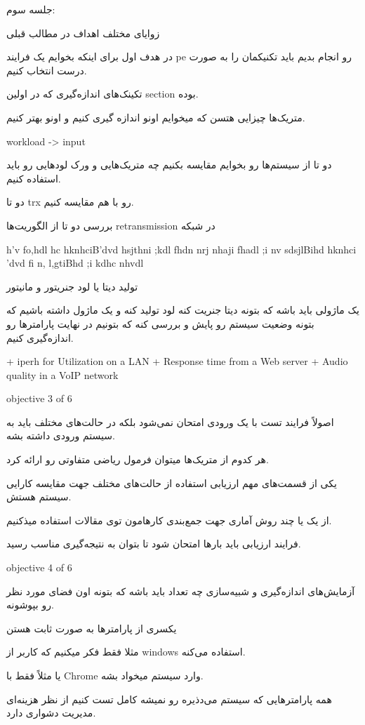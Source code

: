 جلسه سوم:

زوایای مختلف اهداف در مطالب قبلی

در هدف اول برای اینکه بخوایم یک فرایند pe رو انجام بدیم باید تکنیکمان را به صورت درست انتخاب کنیم.

تکینک‌های اندازه‌گیری که در اولین section بوده.

متریک‌ها چیزایی هتسن که میخوایم اونو اندازه گیری کنیم و اونو بهتر کنیم.

workload -> input

دو تا از سیستم‌ها رو بخوایم مقایسه بکنیم چه متریک‌هایی و ورک لود‌هایی رو باید استفاده کنیم.

دو تا trx رو با هم مقایسه کنیم. 

بررسی دو تا از الگوریت‌ها retransmission در شبکه


h'v fo,hdl hc hknhciB'dvd hsjthni ;kdl fhdn nrj nhaji fhadl ;i nv sdsjlBihd
hknhci 'dvd fi n, l,gtiBhd ;i kdhc nhvdl

تولید دیتا یا لود جنریتور و مانیتور

یک ماژولی باید باشه که بتونه دیتا جنریت کنه لود تولید کنه و یک ماژول داشته باشیم
که بتونه وضعیت سیستم رو پایش و بررسی کنه که بتونیم در نهایت پارامتر‌ها رو
اندازه‌گیری کنیم.

+ iperh for Utilization on a LAN
+ Response time from a Web server
+ Audio quality in a VoIP network

objective 3 of 6

اصولاً فرایند تست با یک ورودی امتحان نمی‌شود بلکه در حالت‌های مختلف باید به
سیستم ورودی داشته بشه. 

هر کدوم از متریک‌ها میتوان فرمول ریاضی متفاوتی رو ارائه کرد.

یکی از قسمت‌های مهم ارزیابی استفاده از حالت‌های مختلف جهت مقایسه کارایی سیستم
هستش.

از یک یا چند روش آماری جهت جمع‌بندی کار‌هامون توی مقالات استفاده میذکنیم.

فرایند ارزیابی باید بار‌ها امتحان شود تا بتوان به نتیجه‌گیری مناسب رسید.

objective 4 of 6

آزمایش‌های اندازه‌گیری و شبیه‌سازی چه تعداد باید باشه که بتونه اون فضای مورد نظر
رو بپوشونه.

یکسری از پارامتر‌ها به صورت ثابت هستن

مثلا فقط فکر میکنیم که کاربر از windows استفاده می‌کنه.

یا مثلاً فقط با Chrome وارد سیستم میخواد بشه.

همه پارامتر‌هایی که سیستم می‌دذیره رو نمیشه کامل تست کنیم از نظر هزینه‌ای مدیریت
دشواری دارد.

